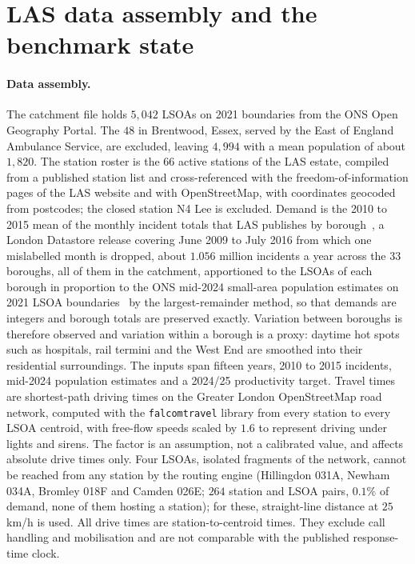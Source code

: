 \documentclass[preprint,12pt,authoryear]{elsarticle}
\theoremstyle{definition}
\begin{document}
\section{LAS data assembly and the benchmark state}
\label{app:slas}

\paragraph{Data assembly.}
The catchment file holds $5{,}042$ LSOAs on 2021 boundaries from the ONS Open Geography Portal. The $48$ in Brentwood, Essex, served by the East of England Ambulance Service, are excluded, leaving $4{,}994$ with a mean population of about $1{,}820$. The station roster is the $66$ active stations of the LAS estate, compiled from a published station list and cross-referenced with the freedom-of-information pages of the LAS website and with OpenStreetMap, with coordinates geocoded from postcodes; the closed station N4 Lee is excluded. Demand is the 2010 to 2015 mean of the monthly incident totals that LAS publishes by borough~\citep{las_incidents}, a London Datastore release covering June 2009 to July 2016 from which one mislabelled month is dropped, about $1.056$ million incidents a year across the $33$ boroughs, all of them in the catchment, apportioned to the LSOAs of each borough in proportion to the ONS mid-2024 small-area population estimates on 2021 LSOA boundaries~\citep{ons_sape2024} by the largest-remainder method, so that demands are integers and borough totals are preserved exactly. Variation between boroughs is therefore observed and variation within a borough is a proxy: daytime hot spots such as hospitals, rail termini and the West End are smoothed into their residential surroundings. The inputs span fifteen years, 2010 to 2015 incidents, mid-2024 population estimates and a 2024/25 productivity target. Travel times are shortest-path driving times on the Greater London OpenStreetMap road network, computed with the \texttt{falcomtravel} library from every station to every LSOA centroid, with free-flow speeds scaled by $1.6$ to represent driving under lights and sirens. The factor is an assumption, not a calibrated value, and affects absolute drive times only. Four LSOAs, isolated fragments of the network, cannot be reached from any station by the routing engine (Hillingdon 031A, Newham 034A, Bromley 018F and Camden 026E; $264$ station and LSOA pairs, $0.1\%$ of demand, none of them hosting a station); for these, straight-line distance at $25$ km/h is used. All drive times are station-to-centroid times. They exclude call handling and mobilisation and are not comparable with the published response-time clock.
\end{document}
